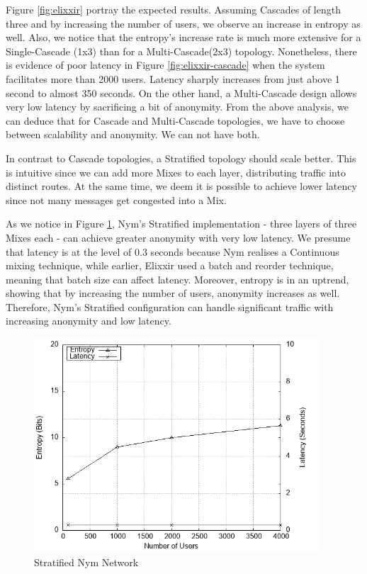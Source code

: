 \documentclass[logo,msc,cyber]{infthesis}   %
\begin{document}
 Figure \ref{fig:elixxir} portray the expected results. Assuming
 Cascades of length three and by increasing the number of users, we observe an
 increase in entropy as well. Also, we notice that the entropy's increase rate
 is much more extensive for a Single-Cascade (1x3) than for a Multi-Cascade(2x3)
 topology. Nonetheless, there is evidence of poor latency in Figure
 \ref{fig:elixxir-cascade} when the system facilitates more than 2000 users.
 Latency sharply increases from just above 1 second to almost 350 seconds. On
 the other hand, a Multi-Cascade design allows very low latency by sacrificing a
 bit of anonymity. From the above analysis, we can deduce that for Cascade and
 Multi-Cascade topologies, we have to choose between scalability and anonymity.
 We can not have both.

 In contrast to Cascade topologies, a Stratified topology should scale better.
 This is intuitive since we can add more Mixes to each layer, distributing
 traffic into distinct routes. At the same time, we deem it is possible to
 achieve lower latency since not many messages get congested into a Mix. 

 As we notice in Figure \ref{fig:nym-stratified}, Nym's Stratified
 implementation - three layers of three Mixes each - can achieve greater anonymity with
 very low latency. We presume that latency is at the level of 0.3 seconds
 because Nym realises a Continuous mixing technique, while earlier, Elixxir used
 a batch and reorder technique, meaning that batch size can affect latency.
 Moreover, entropy is in an uptrend, showing that by increasing the number of
 users, anonymity increases as well. Therefore, Nym's Stratified configuration
 can handle significant traffic with increasing anonymity and low latency.

\begin{figure}[h!]
    \centering
    \includegraphics[height=8cm]{figures/simulator/2.png}
    \caption{Stratified Nym Network}
    \label{fig:nym-stratified}
 \end{figure}
\end{document}
